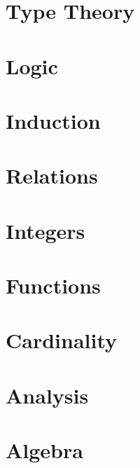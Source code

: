 %






\chapter{Type Theory}


\chapter{Logic}


\chapter{Induction}


\chapter{Relations}


\chapter{Integers}


\chapter{Functions}


\chapter{Cardinality}


\chapter{Analysis}


\chapter{Algebra}




